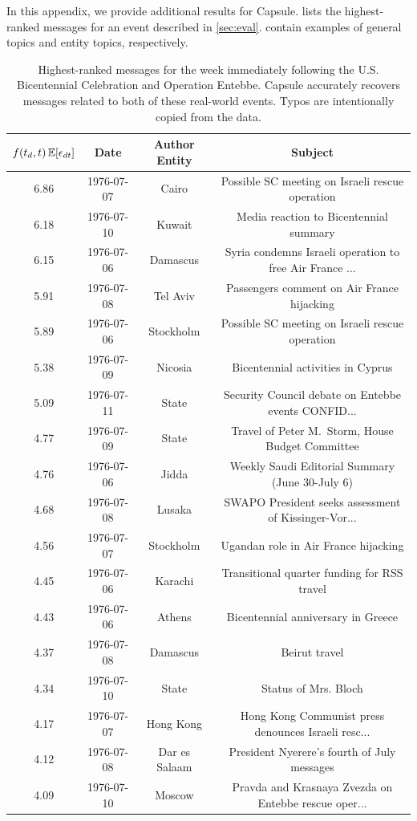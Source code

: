 
In this appendix, we provide additional results for
 Capsule.  lists the highest-ranked messages for an
 event described in \cref{sec:eval}. 
 contain examples of general topics and entity topics, respectively.

\begin{table}[htb]
\small
\centering
\begin{tabular}{cccc}
\toprule
$f(t_d, t)\,\mathbb{E}[\epsilon_{dt}]$ & \textbf{Date} & \textbf{Author Entity} & \textbf{Subject} \\
\midrule
6.86 & 1976-07-07 & Cairo & Possible SC meeting on Israeli rescue operation \\
6.18 & 1976-07-10 & Kuwait & Media reaction to Bicentennial summary \\
6.15 & 1976-07-06 & Damascus & Syria condemns Israeli operation to free Air France ... \\
5.91 & 1976-07-08 & Tel Aviv & Passengers comment on Air France hijacking \\
5.89 & 1976-07-06 & Stockholm & Possible SC meeting on Israeli rescue operation \\
5.38 & 1976-07-09 & Nicosia & Bicentennial activities in Cyprus \\
5.09 & 1976-07-11 & State & Security Council debate on Entebbe events CONFID... \\
4.77 & 1976-07-09 & State & Travel of Peter M.~Storm, House Budget Committee \\
4.76 & 1976-07-06 & Jidda & Weekly Saudi Editorial Summary (June 30-July 6) \\
4.68 & 1976-07-08 & Lusaka & SWAPO President seeks assessment of Kissinger-Vor... \\
4.56 & 1976-07-07 & Stockholm & Ugandan role in Air France hijacking \\
4.45 & 1976-07-06 & Karachi & Transitional quarter funding for RSS travel \\
4.43 & 1976-07-06 & Athens & Bicentennial anniversary in Greece \\
4.37 & 1976-07-08 & Damascus & Beirut travel \\
4.34 & 1976-07-10 & State & Status of Mrs. Bloch \\
4.17 & 1976-07-07 & Hong Kong & Hong Kong Communist press denounces Israeli resc... \\
4.12 & 1976-07-08 & Dar es Salaam & President Nyerere's fourth of July messages \\
4.09 & 1976-07-10 & Moscow & Pravda and Krasnaya Zvezda on Entebbe rescue oper... \\
\bottomrule
\end{tabular}
\caption{Highest-ranked messages for the week immediately following the U.S.
Bicentennial Celebration and Operation Entebbe. Capsule accurately
recovers messages related to both of these real-world events. Typos
are intentionally copied from the data.}
\label{tab:entebbe}
\end{table}

